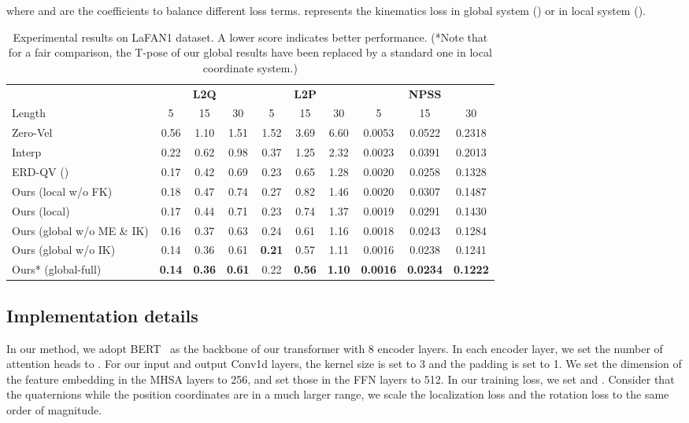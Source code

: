 \documentclass[10pt,twocolumn,letterpaper]{article}
\begin{document}
where  and  are the coefficients to balance different loss terms.  represents the kinematics loss in global system () or in local system ().



\begin{table*}[ht]
\centering
\caption{Experimental results on LaFAN1 dataset. A lower score indicates better performance. (*Note that for a fair comparison, the T-pose of our global results have been replaced by a standard one in local coordinate system.)}
\begin{tabularx}{\textwidth}{l@{\extracolsep{\fill}} ccccccccc}
&\multicolumn{3}{c}{\textbf{L2Q}} &\multicolumn{3}{c}{\textbf{L2P}} &\multicolumn{3}{c}{\textbf{NPSS}} \\
\cmidrule(lr){2-4}\cmidrule(lr){5-7}\cmidrule(lr){8-10}
Length & 5 & 15 & 30 & 5 & 15 & 30 & 5 & 15 & 30\\
\cmidrule(lr){1-10}
Zero-Vel & 0.56 & 1.10 & 1.51 & 1.52 & 3.69 & 6.60 & 0.0053 & 0.0522 & 0.2318 \\
Interp & 0.22 & 0.62 & 0.98 & 0.37 & 1.25 & 2.32 & 0.0023 & 0.0391 & 0.2013 \\
\cmidrule(lr){1-10}
ERD-QV (\cite{harvey2020robust}) & 0.17 & 0.42 & 0.69 & 0.23 & 0.65 & 1.28 & 0.0020 & 0.0258 & 0.1328 \\
Ours (local w/o FK) & 0.18 & 0.47 & 0.74 & 0.27 & 0.82 & 1.46 & 0.0020 & 0.0307 & 0.1487\\
Ours (local)  & 0.17 & 0.44 & 0.71 & 0.23 & 0.74 & 1.37 & 0.0019 & 0.0291 & 0.1430\\
Ours (global w/o ME \& IK) & 0.16 & 0.37 & 0.63 & 0.24 & 0.61 & 1.16 & 0.0018 & 0.0243 & 0.1284\\
Ours (global w/o IK)  & 0.14 & 0.36 & 0.61 & \bf{0.21} & 0.57 & 1.11 & 0.0016 & 0.0238 & 0.1241\\
Ours* (global-full)  & \bf{0.14} & \bf{0.36} & \bf{0.61} & 0.22 & \bf{0.56} & \bf{1.10} & \bf{0.0016} & \bf{0.0234} & \bf{0.1222} \\
\bottomrule
\end{tabularx}\label{tab:inbetweening}
\end{table*}


\subsection{Implementation details}

In our method, we adopt BERT~\cite{devlin2018bert} as the backbone of our transformer with 8 encoder layers. In each encoder layer, we set the number of attention heads to . For our input and output Conv1d layers, the kernel size is set to 3 and the padding is set to 1. We set the dimension of the feature embedding in the MHSA layers to 256, and set those in the FFN layers to 512. In our training loss, we set  and . Consider that the quaternions  while the position coordinates  are in a much larger range, we scale the localization loss and the rotation loss to the same order of magnitude.
\end{document}
